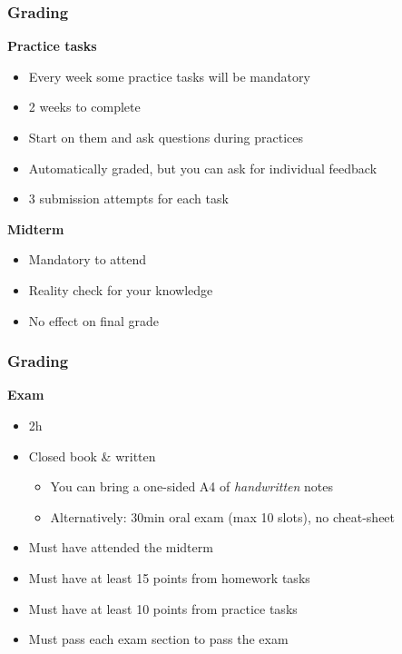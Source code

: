 \begin{frame}
  \frametitle{Grading}

  \pause
  \textbf{Practice tasks}
  \begin{itemize}[<+(1)->]
    \item Every week some practice tasks will be mandatory
    \item 2 weeks to complete
    \item Start on them and ask questions during practices
    \item Automatically graded, but you can ask for individual feedback
    \item 3 submission attempts for each task
  \end{itemize}

  \vspace*{1em}

  \pause
  \textbf{Midterm}
  \begin{itemize}
    \item Mandatory to attend
    \item Reality check for your knowledge
    \item No effect on final grade
  \end{itemize}
\end{frame}

\begin{frame}
  \frametitle{Grading}

  \textbf{Exam}
  \begin{itemize}[<+(1)->]
    \item 2h
    \item Closed book \& written
    \begin{itemize}
      \item You can bring a one-sided A4 of \emph{handwritten} notes
      \item Alternatively: 30min oral exam (max 10 slots), no cheat-sheet
    \end{itemize}
    \item Must have attended the midterm
    \item Must have at least 15 points from homework tasks
    \item Must have at least 10 points from practice tasks
    \item Must pass each exam section to pass the exam
  \end{itemize}
\end{frame}

